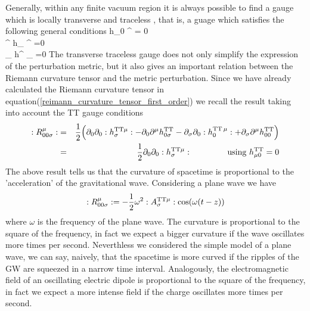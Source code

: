 Generally, within any finite vacuum region it is always possible to find a gauge which is locally transverse and traceless \cite{flanagan_basics_2005}, that is, a guage which satisfies the following general conditions
\bea
h_{0 \nu} ^{\T} = 0 \\
\eta ^{\mu \nu} h_{\mu \nu} ^{\T} =0 \\
\partial_{\mu} h^{\mu \nu} _{\T} =0
\eea
The transverse traceless gauge does not only simplify the expression of the perturbation metric, but it also gives an important relation between the Riemann curvature tensor and the metric perturbation.
Since we have already calculated the Riemann curvature tensor in equation(\ref{reimann_curvature_tensor_first_order}) we recall the result taking into account the TT gauge conditions
\begin{eqnarray}
:R^\mu _{00 \sigma }: 
&=&
\dfrac{1}{2} \qty(
\partial_0 \partial_0 :h^{\text{TT} \mu} _{\sigma}: -
\partial_0 \partial^\mu h^{\text{TT}}_{0 \sigma} -
\partial_\sigma \partial_0 :h^{\text{TT} \,\mu} _{ 0}:  +
\partial_\sigma \partial^\mu h_{0 0} ^{\text{TT}}
) \notag
\\
&=&
\label{reimann_tensor_TT}
\dfrac{1}{2} \partial_0 \partial_0 :h^{\text{TT} \mu} _{\sigma}: 
\hspace{1.5cm} \text{using } h^{\text{TT}} _{\mu 0} =0 
\end{eqnarray}
The above result tells us that the curvature of spacetime is proportional to the 'acceleration' of the gravitational wave. 
Considering a plane wave we have
\[
 :R^\mu _{00 \sigma }: = -\dfrac{1}{2} \omega^2 :A^{\text{TT} \mu} _{\sigma}: \cos (\omega (t-z))
\]
where $\omega$ is the frequency of the plane wave. 
The curvature is proportional to the square of the frequency, in fact we expect a bigger curvature if the wave oscillates more times per second.
Neverthless we considered the simple model of a plane wave, we can say, naively, that the spacetime is more curved if the ripples of the GW are squeezed in a narrow time interval.
Analogously, the electromagnetic field of an oscillating electric dipole is proportional to the square of the frequency, in fact we expect a more intense  field if the charge oscillates more times per second.


